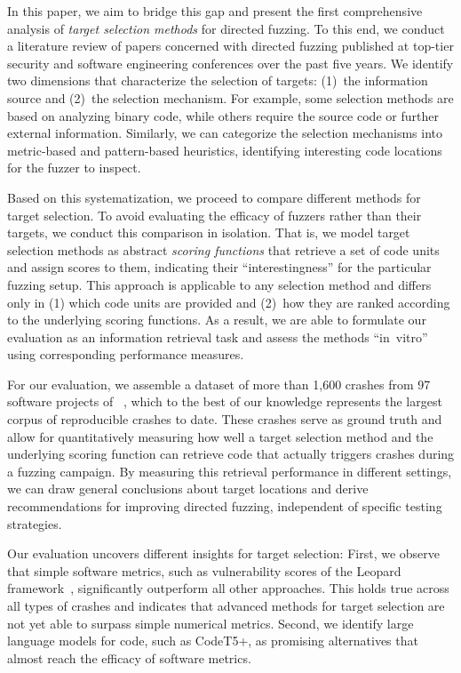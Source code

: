 In this paper, we aim to bridge this gap and present the first comprehensive analysis of \emph{target selection methods} for directed fuzzing. To this end, we conduct a literature review of \numanalyzedpapers papers concerned with directed fuzzing published at top-tier security and software engineering conferences over the past five years. We identify two dimensions that characterize the selection of targets: (1)~the information source and (2)~the selection mechanism. For example, some selection methods are based on analyzing binary code, while others require the source code or further external information. Similarly, we can categorize the selection mechanisms into metric-based and pattern-based heuristics, identifying interesting code locations for the fuzzer to inspect.

Based on this systematization, we proceed to compare different methods for target selection. To avoid evaluating the efficacy of fuzzers rather than their targets, we conduct this comparison in isolation. That is, we model target selection methods as abstract \emph{scoring functions} that retrieve a set of code units and assign scores to them, indicating their ``interestingness'' for the particular fuzzing setup. This approach is applicable to any selection method and differs only in (1) which code units are provided and (2)~how they are ranked according to the underlying scoring functions. As a result, we are able to formulate our evaluation as an information retrieval task and assess the methods ``in~vitro'' using corresponding performance measures.

For our evaluation, we assemble a dataset of more than 1,600 crashes from 97 software projects of \ossfuzz{}~\cite{Ser+23}, which to the best of our knowledge represents the largest corpus of reproducible crashes to date. These crashes serve as ground truth and allow for quantitatively measuring how well a target selection method and the underlying scoring function can retrieve code that actually triggers crashes during a fuzzing campaign. By measuring this retrieval performance in different settings, we can draw general conclusions about target locations and derive recommendations for improving directed fuzzing, independent of specific testing strategies.

Our evaluation uncovers different insights for target selection: First, we observe that simple software metrics, such as vulnerability scores of the Leopard framework~\cite{DuCheLiGuo+19}, significantly outperform all other approaches. This holds true across all types of crashes and indicates that advanced methods for target selection are not yet able to surpass simple numerical metrics. Second, we identify large language models for code, such as CodeT5+, as promising alternatives that almost reach the efficacy of software metrics.

